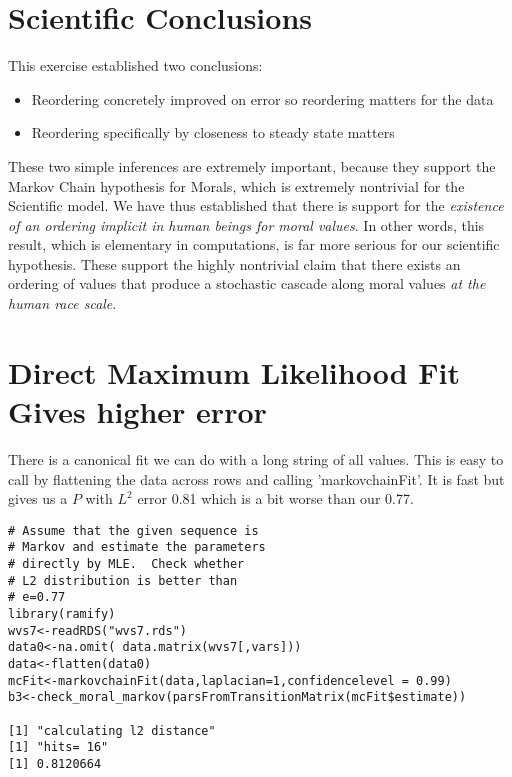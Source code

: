 \documentclass{amsart}
\begin{document}
\section{Scientific Conclusions}

This exercise established two conclusions:

\begin{itemize}
\item{Reordering concretely improved on error so reordering matters for the data}
\item{Reordering specifically by closeness to steady state matters}
\end{itemize}

These two simple inferences are extremely important, because they support the Markov Chain hypothesis for Morals, which is extremely nontrivial for the Scientific model.  We have thus established that there is support for the {\em existence of an ordering implicit in human beings for moral values}.  In other words, this result, which is elementary in computations, is far more serious for our scientific hypothesis.  These support the highly nontrivial claim that there exists an ordering of values that produce a stochastic cascade along moral values {\em at the human race scale}.


\section{Direct Maximum Likelihood Fit Gives higher error}

There is a canonical fit we can do with a long string of all values.  This is easy to call by flattening the data across rows and calling 'markovchainFit'.  It is fast but gives us a $P$ with $L^2$ error 0.81 which is a bit worse than our 0.77.

\begin{verbatim}
# Assume that the given sequence is
# Markov and estimate the parameters
# directly by MLE.  Check whether 
# L2 distribution is better than 
# e=0.77
library(ramify)
wvs7<-readRDS("wvs7.rds")
data0<-na.omit( data.matrix(wvs7[,vars]))
data<-flatten(data0)
mcFit<-markovchainFit(data,laplacian=1,confidencelevel = 0.99)
b3<-check_moral_markov(parsFromTransitionMatrix(mcFit$estimate))

[1] "calculating l2 distance"
[1] "hits= 16"
[1] 0.8120664
\end{verbatim}
\end{document}
